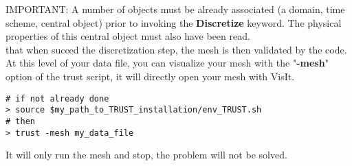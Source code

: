 IMPORTANT: A number of objects must be already associated (a domain, time scheme, central object) prior to invoking the \textbf{Discretize} keyword. The physical properties of this central object must also have been read.\\

\Note that when \trust succed the discretization step, the mesh is then validated by the code.\\

At this level of your data file, you can visualize your mesh with the "\textbf{-mesh}" option of the trust script, it will directly open your mesh with VisIt.
\begin{verbatim}
# if not already done
> source $my_path_to_TRUST_installation/env_TRUST.sh
# then
> trust -mesh my_data_file
\end{verbatim}
It will only run the mesh and stop, the problem will not be solved.



